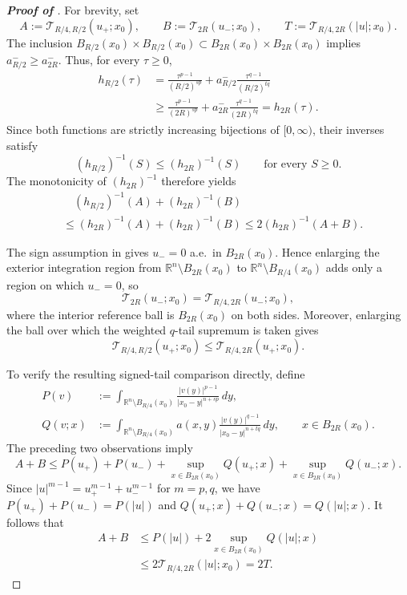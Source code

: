 \documentclass[reqno]{amsart}
\newcommand{\R}{\mathbb R}
\newcommand{\dd}{\,d}
\newcommand{\calT}{\mathcal T}
\theoremstyle{plain}
\theoremstyle{definition}
\theoremstyle{remark}
\numberwithin{equation}{section}
\begin{document}
\begin{proof}[\textbf{Proof of }]
For brevity, set
\[
    A:=\calT_{R/4,R/2}(u_+;x_0),
    \qquad
    B:=\calT_{2R}(u_-;x_0),
    \qquad
    T:=\calT_{R/4,2R}(|u|;x_0).
\]
The inclusion \(B_{R/2}(x_0)\times B_{R/2}(x_0)\subset B_{2R}(x_0)\times B_{2R}(x_0)\) implies \(a_{R/2}^-\ge a_{2R}^-\).  Thus, for every $\tau\ge0$,
\[
\begin{aligned}
    h_{R/2}(\tau)
    &=\frac{\tau^{p-1}}{(R/2)^{sp}}
      +a_{R/2}^-\frac{\tau^{q-1}}{(R/2)^{tq}}\\
    &\ge
      \frac{\tau^{p-1}}{(2R)^{sp}}
      +a_{2R}^-\frac{\tau^{q-1}}{(2R)^{tq}}
      =h_{2R}(\tau).
\end{aligned}
\]
Since both functions are strictly increasing bijections of
\([0,\infty)\), their inverses satisfy
\[
    (h_{R/2})^{-1}(S)\le (h_{2R})^{-1}(S)
    \qquad\text{for every }S\ge0.
\]
The monotonicity of \((h_{2R})^{-1}\) therefore yields
\begin{equation}\label{eq:inverse-tail-comparison}
\begin{aligned}
    &\quad(h_{R/2})^{-1}(A)+(h_{2R})^{-1}(B)\\
    &\le
    (h_{2R})^{-1}(A)+(h_{2R})^{-1}(B)
    \le 2(h_{2R})^{-1}(A+B).
\end{aligned}
\end{equation}

The sign assumption in  gives \(u_-=0\) a.e.\ in
\(B_{2R}(x_0)\). Hence enlarging the exterior integration region from
\(\R^n\setminus B_{2R}(x_0)\) to \(\R^n\setminus B_{R/4}(x_0)\) adds only a region on which \(u_-=0\), so
\[
    \calT_{2R}(u_-;x_0)
    =\calT_{R/4,2R}(u_-;x_0),
\]
where the interior reference ball is \(B_{2R}(x_0)\) on both sides. Moreover, enlarging the ball over which the weighted \(q\)-tail supremum
is taken gives
\[
    \calT_{R/4,R/2}(u_+;x_0)
    \le \calT_{R/4,2R}(u_+;x_0).
\]

To verify the resulting signed-tail comparison directly, define
\[
\begin{aligned}
    P(v)
    &:={}
      \int_{\R^n\setminus B_{R/4}(x_0)}
      \frac{|v(y)|^{p-1}}{|x_0-y|^{n+sp}}\dd y,\\
    Q(v;x)
    &:={}
      \int_{\R^n\setminus B_{R/4}(x_0)}
      a(x,y)\frac{|v(y)|^{q-1}}{|x_0-y|^{n+tq}}\dd y,
      \qquad x\in B_{2R}(x_0).
\end{aligned}
\]
The preceding two observations imply
\[
    A+B
    \le P(u_+)+P(u_-)+
       \sup_{x\in B_{2R}(x_0)}Q(u_+;x)
       +\sup_{x\in B_{2R}(x_0)}Q(u_-;x).
\]
Since \(|u|^{m-1}=u_+^{m-1}+u_-^{m-1}\) for \(m=p,q\), we have
\(P(u_+)+P(u_-)=P(|u|)\) and
\(Q(u_+;x)+Q(u_-;x)=Q(|u|;x)\). It follows that
\begin{equation}\label{eq:signed-tail-comparison}
\begin{aligned}
    A+B
    &\le P(|u|)+2\sup_{x\in B_{2R}(x_0)}Q(|u|;x)\\
    &\le2\calT_{R/4,2R}(|u|;x_0)=2T.
\end{aligned}
\end{equation}


\end{proof}
\end{document}

